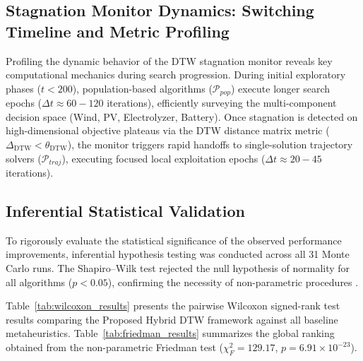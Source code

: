 \subsection{Stagnation Monitor Dynamics: Switching Timeline and Metric Profiling}
\label{sec:results_ablation}

Profiling the dynamic behavior of the DTW stagnation monitor reveals key computational mechanics during search progression. During initial exploratory phases ($t < 200$), population-based algorithms ($\mathcal{P}_{pop}$) execute longer search epochs ($\Delta t \approx 60 - 120$ iterations), efficiently surveying the multi-component decision space (Wind, PV, Electrolyzer, Battery). Once stagnation is detected on high-dimensional objective plateaus via the DTW distance matrix metric ($\Delta_{\text{DTW}} < \theta_{\text{DTW}}$), the monitor triggers rapid handoffs to single-solution trajectory solvers ($\mathcal{P}_{traj}$), executing focused local exploitation epochs ($\Delta t \approx 20 - 45$ iterations).

\subsection{Inferential Statistical Validation}
\label{sec:results_statistics}

To rigorously evaluate the statistical significance of the observed performance improvements, inferential hypothesis testing was conducted across all 31 Monte Carlo runs. The Shapiro--Wilk test rejected the null hypothesis of normality for all algorithms ($p < 0.05$), confirming the necessity of non-parametric procedures \cite{derrac2011practical,carrasco2020recent}.

Table~\ref{tab:wilcoxon_results} presents the pairwise Wilcoxon signed-rank test results comparing the Proposed Hybrid DTW framework against all baseline metaheuristics. Table~\ref{tab:friedman_results} summarizes the global ranking obtained from the non-parametric Friedman test ($\chi^2_F = 129.17$, $p = 6.91 \times 10^{-23}$).


